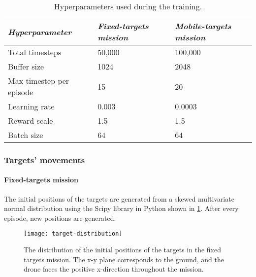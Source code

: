 \documentclass[../main.tex]{subfiles}
\begin{document}
\begin{table}[tbp]
    \centering
    \caption{Hyperparameters used during the training.}
    \label{tab:hyperparameters}
    \begin{tabularx}{0.8\textwidth}{ X l l }
        \toprule
        \textit{Hyperparameter} 
            & \textit{Fixed-targets mission} 
                & \textit{Mobile-targets mission} \\

        \midrule
        
        Total timesteps
            & 50,000 
                & 100,000 
                \\
        Buffer size 
            & 1024 
                & 2048 
                \\
        
                \raggedright Max timestep per \newline 
                \hphantom{M} episode
            & 15
                & 20
                \\

        Learning rate
            & 0.003
                & 0.0003
                \\
        
        Reward scale
            & 1.5 
                & 1.5 
                \\

        Batch size
            & 64
                & 64
                \\

        \bottomrule		
    \end{tabularx}
\end{table}

\subsubsection{Targets' movements}

\paragraph{Fixed-targets mission}

The initial positions of the targets are generated from a skewed
multivariate normal distribution using the Scipy library in Python
shown in \cref{fig:position-distribution}.
After every episode, new positions are generated.

\begin{figure}[tbp]
	\centering
	\texttt{[image: target-distribution]}
	\caption{The distribution of the initial positions of the
            targets in the fixed targets mission. The x-y plane
            corresponds to the ground, and the drone faces the positive
            x-direction throughout the mission.}
	\label{fig:position-distribution}
\end{figure}
\end{document}
